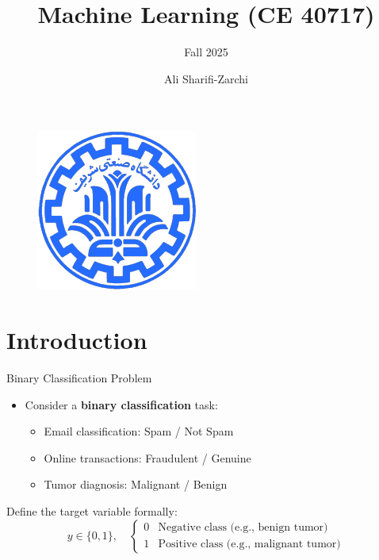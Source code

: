 \documentclass[serif, aspectratio=169]{beamer}
\author{Ali Sharifi-Zarchi}
\title{Machine Learning (CE 40717)}
\subtitle{Fall 2025}
\institute{
    CE Department \\
    Sharif University of Technology
}
\begin{document}
    \begin{frame}
        \titlepage
        \vspace*{-0.6cm}
        \begin{figure}[htpb]
            \begin{center}
                \includegraphics[keepaspectratio, scale=0.25]{pic/sharif-main-logo.png}
            \end{center}
        \end{figure}
        \vfill %
        \vspace{-0.35cm}
    \end{frame}

    \begin{frame}
        \tableofcontents[sectionstyle=show,
            subsectionstyle=show/shaded/hide,
            subsubsectionstyle=show/shaded/hide]
    \end{frame}


    \section{Introduction}

    \begin{frame}{Binary Classification Problem}
        \begin{itemize}
            \item Consider a \textbf{binary classification} task:
            \begin{itemize}
                \item Email classification: Spam / Not Spam
                \item Online transactions: Fraudulent / Genuine
                \item Tumor diagnosis: Malignant / Benign
            \end{itemize}
        \end{itemize}

        \vspace{0.5em}
        Define the target variable formally:
        \[
            y \in \{0, 1\}, \quad
            \begin{cases}
                0 & \text{Negative class (e.g., benign tumor)}\\
                1 & \text{Positive class (e.g., malignant tumor)}
            \end{cases}
        \]
    \end{frame}
\end{document}
